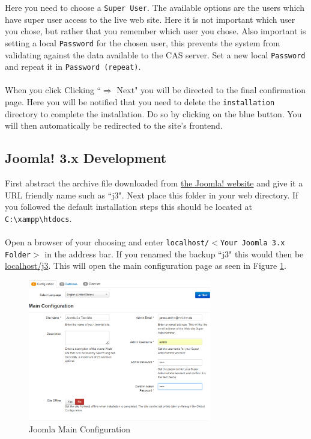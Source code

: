 \documentclass[]{report}
\begin{document}
\noindent
Here you need to choose a \texttt{Super User}. The available options are the users which have super user access to the live web site. Here it is not important which user you chose, but rather that you remember which user you chose. Also important is setting a local \texttt{Password} for the chosen user, this prevents the system from validating against the data available to the CAS server. Set a new local  \texttt{Password} and repeat it in  \texttt{Password (repeat)}.\\
\\
When you click Clicking ``$\Rightarrow$ Next" you will be directed to the final confirmation page. Here you will be notified that you need to delete the \texttt{installation} directory to complete the installation. Do so by clicking on the blue button. You will then automatically be redirected to the site's frontend.

\subsection{Joomla! 3.x Development}

First abstract the archive file downloaded from \href{http://www.joomla.org/download.html}{the Joomla! website} and give it a URL friendly name such as ``j3". Next place this folder in your web directory. If you followed the default installation steps this should be located at \texttt{C:\textbackslash xampp\textbackslash htdocs}.\\
\\
Open a browser of your choosing and enter \texttt{localhost/$<$Your Joomla 3.x Folder$>$} in the address bar. If you renamed the backup ``j3" this would then be \url{localhost/j3}. This will open the main configuration page as seen in Figure \ref{fig:j3mainconfiguration}.

\newpage

\begin{figure}[h] 
	\centering
	\includegraphics[width=8cm]{j3mainconfiguration.png}
	\caption{Joomla Main Configuration}
	\label{fig:j3mainconfiguration}
\end{figure}
\end{document}
